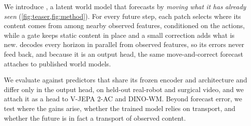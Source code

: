 We introduce \ours{}, a latent world model that forecasts by \emph{moving what it has already seen}
(\cref{fig:teaser,fig:method}).
%
For every future step, each patch selects where its content comes from among nearby observed features, conditioned on
the actions, while a gate keeps static content in place and a small correction adds what is new.
%
\ours{} decodes every horizon in parallel from observed features, so its errors never feed back, and because it is an
output head, the same move-and-correct forecast attaches to published world models.

We evaluate \ours{} against predictors that share its frozen encoder and architecture and differ only in the output
head, on held-out real-robot and surgical video, and we attach it as a head to V-JEPA 2-AC and DINO-WM.
%
Beyond forecast error, we test where the gains arise, whether the trained model relies on transport, and whether the
future is in fact a transport of observed content.

